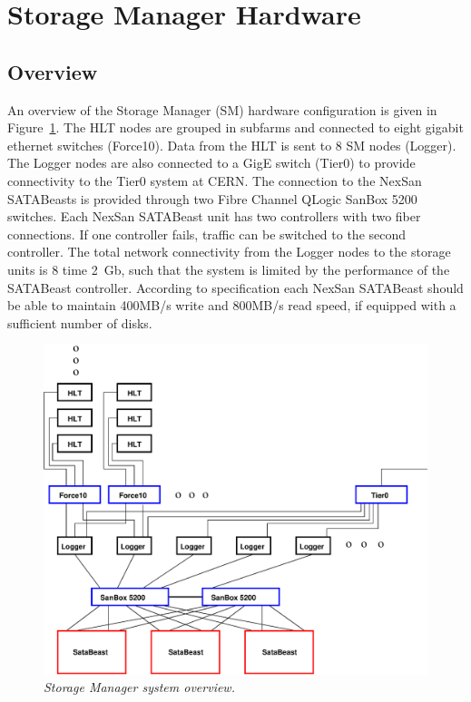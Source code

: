 \section{Storage Manager Hardware} 
\subsection{Overview} 
An overview of the Storage Manager (SM) hardware configuration is given in Figure~\ref{fig:system}. 
The HLT nodes are grouped in subfarms and connected to eight gigabit ethernet switches (Force10). Data from the HLT is sent to 8 SM nodes (Logger). 
The Logger nodes are also connected to a GigE switch (Tier0) to provide connectivity to the Tier0 system at CERN.
The connection to the NexSan SATABeasts is provided through two Fibre Channel QLogic SanBox 5200 switches. Each NexSan SATABeast unit has two controllers with two fiber connections. If one controller fails, traffic can be switched to the second controller. The total network connectivity from the Logger nodes to the storage units is 8 time 2~Gb, such that the system is limited by the performance of the SATABeast controller. According to specification each NexSan SATABeast should be able to maintain 400MB/s write and 800MB/s read speed, if equipped with a sufficient number of disks.

\begin{figure}[tbh]
\begin{center}  
\includegraphics[width=1.0\textwidth]{Hardware/SMsystem.eps}
\caption{\emph{ Storage Manager system overview. }}
\label{fig:system}
\end{center}
\end{figure}  

